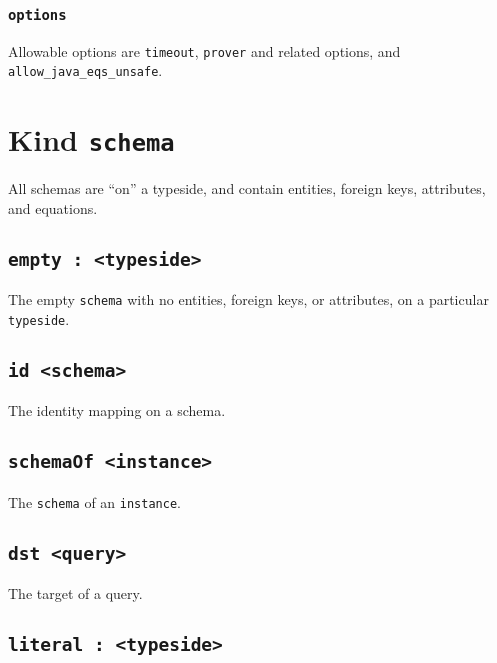 \documentclass[10pt]{book}
\begin{document}
\subsection{{\tt options}}
Allowable options are {\tt timeout}, {\tt prover} and related options, and {\tt allow\_java\_eqs\_unsafe}.

\chapter{Kind {\tt schema}}

All schemas are ``on'' a typeside, and contain entities, foreign keys, attributes, and equations.

\section{{\tt empty : <typeside>}}
The empty {\tt schema} with no entities, foreign keys, or attributes, on a particular {\tt typeside}.

\section{{\tt id <schema>}}
The identity mapping on a schema.

\section{{\tt schemaOf <instance>}}
The {\tt schema} of an {\tt instance}.

%
%
%
\section{{\tt dst <query>}}
The target of a query.

\section{{\tt literal : <typeside>}}
\end{document}
